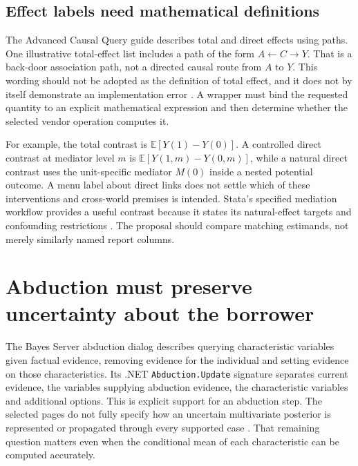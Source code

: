 \subsection{Effect labels need mathematical definitions}

The Advanced Causal Query guide describes total and direct effects using paths.
One illustrative total-effect list includes a path of the form
$A\leftarrow C\rightarrow Y$. That is a back-door association path, not a
directed causal route from $A$ to $Y$. This wording should not be adopted as
the definition of total effect, and it does not by itself demonstrate an
implementation error \citep{exec14_ci_causal_query}. A wrapper must bind the
requested quantity to an explicit mathematical expression and then determine
whether the selected vendor operation computes it.

For example, the total contrast is
$\mathbb E[Y(1)-Y(0)]$. A controlled direct contrast at mediator level $m$ is
$\mathbb E[Y(1,m)-Y(0,m)]$, while a natural direct contrast uses the
unit-specific mediator $M(0)$ inside a nested potential outcome. A menu label
about direct links does not settle which of these interventions and
cross-world premises is intended. Stata's specified mediation workflow
provides a useful contrast because it states its natural-effect targets and
confounding restrictions \citep{exec13_ci_stata_mediate}. The proposal should
compare matching estimands, not merely similarly named report columns.

\section{Abduction must preserve uncertainty about the borrower}

The Bayes Server abduction dialog describes querying characteristic variables
given factual evidence, removing evidence for the individual and setting
evidence on those characteristics. Its .NET \texttt{Abduction.Update} signature
separates current evidence, the variables supplying abduction evidence, the
characteristic variables and additional options. This is explicit support for
an abduction step. The selected pages do not fully specify how an uncertain
multivariate posterior is represented or propagated through every supported
case \citep{exec14_ci_abduction,exec14_ci_api_abduction}. That remaining
question matters even when the conditional mean of each characteristic can
be computed accurately.

